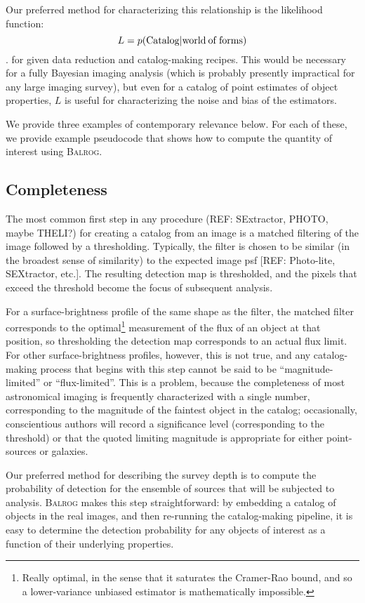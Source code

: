 \documentclass[11pt]{book}
\newcommand{\balrog}{\textsc{Balrog}}
\begin{document}
Our preferred method for characterizing this relationship is the
likelihood function:
\begin{equation}
L = p( {\rm Catalog} | {\rm world\: of\: forms})
\end{equation}.
for given data reduction and catalog-making recipes. This would be
necessary for a fully Bayesian imaging analysis (which is probably presently impractical
for any large imaging survey), but even for a catalog of
point estimates of object properties, $L$ is useful for characterizing
the noise and bias of the estimators.

We provide three examples of contemporary relevance below. For each of
these, we provide example pseudocode that shows how to compute the
quantity of interest using \balrog{}.

\subsection{Completeness}
The most common first step in any procedure (REF: SExtractor, PHOTO,
maybe THELI?) for creating a catalog from an image is a matched
filtering of the image followed by a thresholding. Typically, the
filter is chosen to be similar (in the broadest sense of similarity)
to the expected image psf [REF: Photo-lite, SEXtractor, etc.]. The
resulting detection map is thresholded, and the pixels that exceed the
threshold become the focus of subsequent analysis.

For a surface-brightness profile of the same shape as the filter, the
matched filter corresponds to the optimal\footnote{Really optimal, in
  the sense that it saturates the Cramer-Rao bound, and so a
  lower-variance unbiased estimator is mathematically impossible.}
measurement of the flux of an object at that position, so thresholding
the detection map corresponds to an actual flux limit. For other
surface-brightness profiles, however, this is not true, and any
catalog-making process that begins with this step cannot be said to be
``magnitude-limited'' or ``flux-limited''. This is a problem, because
the completeness of most astronomical imaging is frequently
characterized with a single number, corresponding to the magnitude of
the faintest object in the catalog; occasionally, conscientious
authors will record a significance level (corresponding to the
threshold) or that the quoted limiting magnitude is appropriate
for either point-sources or galaxies. 

Our preferred method for describing the survey depth is to compute the
probability of detection for the ensemble of sources that will be
subjected to analysis. \balrog{} makes this step straightforward: by
embedding a catalog of objects in the real images, and then re-running
the catalog-making pipeline, it is easy to determine the detection
probability for any objects of interest as a function of their
underlying properties.
\end{document}
